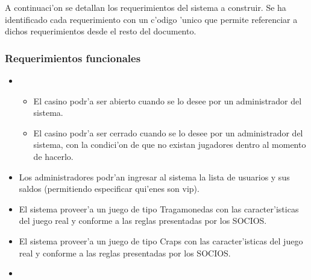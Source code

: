 A continuaci'on se detallan los requerimientos del sistema a construir. Se ha identificado cada requerimiento con un c'odigo 'unico que permite referenciar a dichos requerimientos desde el resto del documento.

\subsubsection{Requerimientos funcionales}



\begin{itemize}

\item {} 

    \begin{itemize}
        \item El casino podr'a ser abierto cuando se lo desee por un administrador del sistema. 
        \item El casino podr'a ser cerrado cuando se lo desee por un administrador del sistema, con la condici'on de que no existan jugadores dentro al momento de hacerlo.
    \end{itemize}

\item {} 

    Los administradores podr'an ingresar al sistema la lista de usuarios y sus saldos (permitiendo especificar qui'enes son vip).

\item {} 

    El sistema proveer'a un juego de tipo Tragamonedas con las caracter'isticas del juego real y conforme a las reglas presentadas por los SOCIOS.

\item {}

    El sistema proveer'a un juego de tipo Craps con las caracter'isticas del juego real y conforme a las reglas presentadas por los SOCIOS.

\item {}


\end{itemize}
